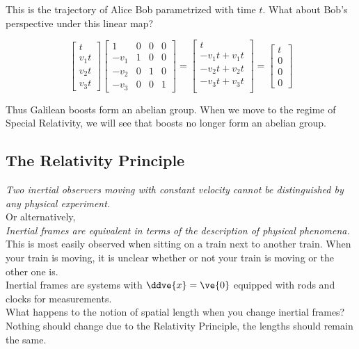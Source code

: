 \documentclass{article}
\newcommand{\mtrx}[1]{
    \begin{bmatrix}
    #1
    \end{bmatrix}
}
\begin{document}
This is the trajectory of Alice \wrt Bob parametrized with time $t$. What about Bob's perspective under this linear map?

\[ \mtrx{t \\ v_1t \\ v_2t \\ v_3t } \mtrx{1 & 0 & 0 & 0 \\ -v_1 & 1 & 0 & 0 \\ -v_2 & 0 & 1 & 0 \\ -v_3 & 0 & 0 & 1} = \mtrx{t \\ -v_1t + v_1t \\ -v_2t + v_2t \\ -v_3t + v_3t \\} = \mtrx{t \\ 0 \\ 0 \\ 0} \]

Thus Galilean boosts form an abelian group. When we move to the regime of Special Relativity, we will see that boosts no longer form an abelian group.

\subsection{The Relativity Principle}

\textit{Two inertial observers moving with constant velocity cannot be distinguished by any physical experiment.} \\

Or alternatively, \\

\textit{Inertial frames are equivalent in terms of the description of physical phenomena.} \\

This is most easily observed when sitting on a train next to another train. When your train is moving, it is unclear whether or not your train is moving or the other one is. \\

Inertial frames are systems with $\ddve{x} = \ve{0}$ equipped with rods and clocks for measurements. \\

What happens to the notion of spatial length when you change inertial frames? Nothing should change due to the Relativity Principle, the lengths should remain the same.

\begin{center}
\end{center}
\end{document}
